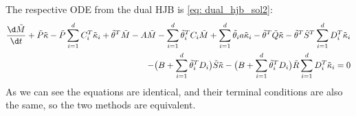The respective ODE from the dual HJB is \eqref{eq: dual_hjb_sol2}:
\begin{align*}
    \frac{\d \tilde{M}}{\d t} + \tilde{P} \tilde{\kappa} - \tilde{P} \sum_{i=1}^d C_i^T \tilde{\kappa}_i + \tilde{\theta}^T \tilde{M} - A\tilde{M} - \sum_{i=1}^d \tilde{\theta}_i^T C_i \tilde{M} 
    + \sum_{i=1}^d\tilde{\theta}_i a \tilde{\kappa}_i - \tilde{\theta}^T \tilde{Q} \tilde{\kappa} - \tilde{\theta}^T \tilde{S}^T \sum_{i=1}^d D_i^T \tilde{\kappa}_i\\
    - \big(B + \sum_{i=1}^d\tilde{\theta}_i^T D_i \big)\tilde{S}\tilde{\kappa} - \big( B + \sum_{i=1}^d \tilde{\theta}_i^T D_i \big) \tilde{R} \sum_{i=1}^dD_i^T \tilde{\kappa}_i = 0
\end{align*}
As we can see the equations are identical, and their terminal conditions are also the same, so the two methods are equivalent. 
